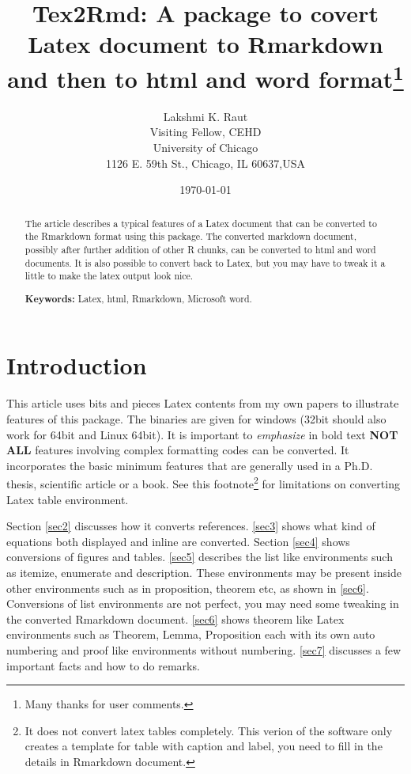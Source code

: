 \documentclass[12pt,svgnames]{article}
\begin{document}
\title{Tex2Rmd: A package to covert Latex document to Rmarkdown and then to html and word format\thanks{%
Many thanks for user comments.
}}
\author{Lakshmi K. Raut \\
Visiting Fellow, CEHD\\
University of Chicago\\
1126 E. 59th St., Chicago, IL 60637,USA
}
\date{\today}
\maketitle 
\begin{abstract}
The article describes a typical features of a Latex document that can be converted to the Rmarkdown format using this package. The converted markdown document, possibly after further addition of other R chunks, can be converted to html and word documents. It is also possible to convert back to Latex, but you may have to tweak it a little to make the latex output look nice. 

\textbf{Keywords:} Latex, html, Rmarkdown, Microsoft word. 
\end{abstract}

\section{Introduction}\label{sec1}
This article uses bits and pieces Latex contents from my own papers to illustrate features of this package. The binaries are given for windows (32bit should also work for 64bit and Linux 64bit). It is important to \emph{emphasize} in bold text \textbf{NOT ALL} features involving complex formatting codes can be converted.  It incorporates the basic minimum features that are generally used in a Ph.D. thesis, scientific article or a book. See this footnote\footnote{%
It does not convert latex tables completely. This verion of the software only creates a template for table with caption and label, you need to fill in the details in Rmarkdown document.} for limitations on converting Latex table environment.

Section \ref{sec2} discusses how it converts references. \autoref{sec3} shows what kind of equations both displayed and inline are converted. Section \ref{sec4} shows conversions of figures and tables. \autoref{sec5} describes the list like environments such as itemize, enumerate and description. These environments may be present inside other environments such as in proposition, theorem etc, as shown in \autoref{sec6}. Conversions of list environments are not perfect, you may need some tweaking in the converted Rmarkdown document. \autoref{sec6} shows theorem like Latex environments such as Theorem, Lemma, Proposition each with its own auto numbering and proof like environments without numbering. \autoref{sec7} discusses a few important facts and how to do remarks.
\end{document}
